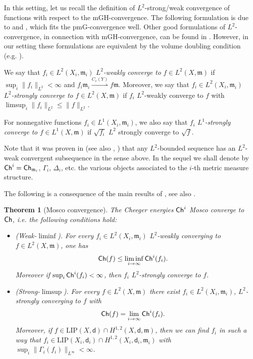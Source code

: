 \documentclass[a4paper,11pt,reqno]{article}
\numberwithin{equation}{section}
\theoremstyle{plain}
\newtheorem{theorem}{Theorem}[section]
\theoremstyle{definition}
\theoremstyle{remark}
\newcommand{\Ch}{{\sf Ch}}
\newcommand{\dist}{\mathsf{d}}
\newcommand{\meas}{\mathfrak{m}}
\begin{document}
In this setting, let us recall the definition of $L^2$-strong/weak convergence of functions with respect to the mGH-convergence.
The following formulation is due to \cite{GigliMondinoSavare13} and \cite{AmbrosioStraTrevisan}, which fits the pmG-convergence well.
Other good formulations of $L^2$-convergence, in connection with mGH-convergence, can be found in \cite{Honda2, KuwaeShioya03}.
However, in our setting these formulations are equivalent by the volume doubling condition (e.g. \cite[Proposition 3.3]{Honda7}). 

\begin{definition}\label{def:l2}
We say that $f_i \in L^2(X_i, \meas_i)$ \textit{$L^2$-weakly converge to $f \in L^2(X, \meas )$} 
if $\sup_i\|f_i\|_{L^2}<\infty$ and $f_i\meas_i \stackrel{C_c(Y)}{\rightharpoonup} f\meas$.
Moreover, we say that $f_i\in L^2(X_i,\meas_i)$ \textit{$L^2$-strongly converge to $f\in L^2(X,\meas)$} if 
$f_i$ $L^2$-weakly converge to $f$ with $\limsup_i\|f_i\|_{L^2}\le \|f\|_{L^2}$. 
\end{definition}

For nonnegative functions $f_i\in L^1(X_i,\meas_i)$, we also say that $f_i$ 
\textit{$L^1$-strongly converge to $f\in L^1(X,\meas)$} if $\sqrt{f_i}$ $L^2$ strongly
converge to $\sqrt{f}$.

Note that it was proven in \cite{GigliMondinoSavare13} (see also \cite{AmbrosioStraTrevisan}, \cite{AmbrosioHonda}) 
that any $L^2$-bounded sequence has an $L^2$-weak convergent subsequence in the sense above. In the sequel
we shall denote by $\Ch^i=\Ch_{\meas_i}$, $\Gamma_i$, $\Delta_i$, etc. the various objects associated to the $i$-th
metric measure structure.

The following is a consequence of the main results of \cite{GigliMondinoSavare13}, see also \cite{AmbrosioHonda}.

\begin{theorem}[Mosco convergence]\label{thm:Mosco}
The Cheeger energies $\Ch^i$ Mosco converge to $\Ch$, i.e. the 
following conditions hold:
\begin{itemize}
\item[(a)] (\emph{Weak-$\liminf$}). For every $f_i\in L^2(X_i,\meas_i)$ $L^2$-weakly converging to $f\in L^2(X,\meas)$, one has
\[ \Ch(f)\le \liminf_{i\to\infty} \Ch^i(f_i).\]
Moreover if $\sup_i\Ch^i(f_i)<\infty$, then $f_i$ $L^2$-strongly converge to $f$.
\item[(b)] (\emph{Strong-$\limsup$}). For every $f \in L^2(X,\meas)$ there exist $f_i\in L^2(X_i,\meas_i)$, $L^2$-strongly converging to $f$ with
\begin{equation}\label{eq:optimal_Chee} \Ch(f)=\lim_{i\to \infty} \Ch^i(f_i).\end{equation}
Moreover, if $f \in \mathrm{LIP}(X, \dist) \cap H^{1, 2}(X, \dist, \meas)$, then we can find $f_i$ in such a way that
$f_i \in \mathrm{LIP}(X_i, \dist_i) \cap H^{1, 2}(X_i, \dist_i, \meas_i)$ with $\sup_i\|\Gamma_i(f_i)\|_{L^{\infty}}<\infty$.
\end{itemize}
\end{theorem}
\end{document}

